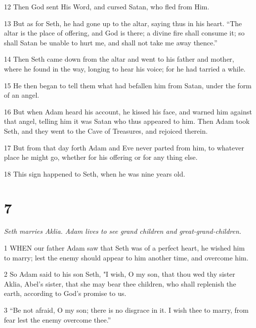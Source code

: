\par 12 Then God sent His Word, and cursed Satan, who fled from Him.

\par 13 But as for Seth, he had gone up to the altar, saying thus in his heart. “The altar is the place of offering, and God is there; a divine fire shall consume it; so shall Satan be unable to hurt me, and shall not take me away thence.”

\par 14 Then Seth came down from the altar and went to his father and mother, where he found in the way, longing to hear his voice; for he had tarried a while.

\par 15 He then began to tell them what had befallen him from Satan, under the form of an angel.

\par 16 But when Adam heard his account, he kissed his face, and warned him against that angel, telling him it was Satan who thus appeared to him. Then Adam took Seth, and they went to the Cave of Treasures, and rejoiced therein.

\par 17 But from that day forth Adam and Eve never parted from him, to whatever place he might go, whether for his offering or for any thing else.

\par 18 This sign happened to Seth, when he was nine years old.

\chapter{7}

\par \textit{Seth marries Aklia. Adam lives to see grand children and great-grand-children.}

\par 1 WHEN our father Adam saw that Seth was of a perfect heart, he wished him to marry; lest the enemy should appear to him another time, and overcome him.

\par 2 So Adam said to his son Seth, "I wish, O my son, that thou wed thy sister Aklia, Abel's sister, that she may bear thee children, who shall replenish the earth, according to God's promise to us.

\par 3 “Be not afraid, O my son; there is no disgrace in it. I wish thee to marry, from fear lest the enemy overcome thee.”

